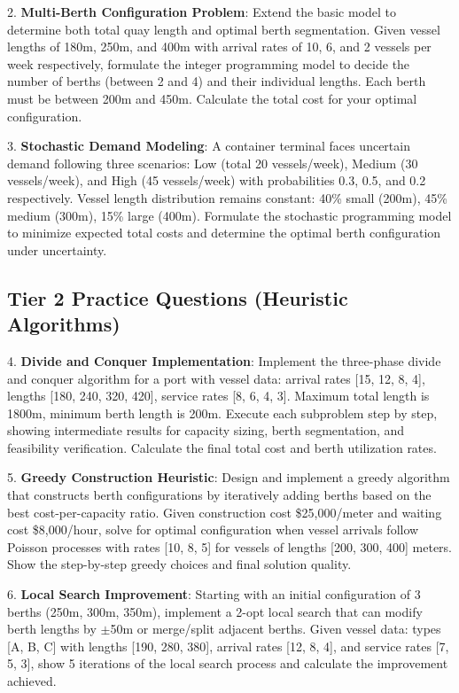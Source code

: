 \documentclass{article}
\begin{document}
2. \textbf{Multi-Berth Configuration Problem}: Extend the basic model to determine both total quay length and optimal berth segmentation. Given vessel lengths of 180m, 250m, and 400m with arrival rates of 10, 6, and 2 vessels per week respectively, formulate the integer programming model to decide the number of berths (between 2 and 4) and their individual lengths. Each berth must be between 200m and 450m. Calculate the total cost for your optimal configuration.

3. \textbf{Stochastic Demand Modeling}: A container terminal faces uncertain demand following three scenarios: Low (total 20 vessels/week), Medium (30 vessels/week), and High (45 vessels/week) with probabilities 0.3, 0.5, and 0.2 respectively. Vessel length distribution remains constant: 40\% small (200m), 45\% medium (300m), 15\% large (400m). Formulate the stochastic programming model to minimize expected total costs and determine the optimal berth configuration under uncertainty.

\subsection{Tier 2 Practice Questions (Heuristic Algorithms)}

4. \textbf{Divide and Conquer Implementation}: Implement the three-phase divide and conquer algorithm for a port with vessel data: arrival rates [15, 12, 8, 4], lengths [180, 240, 320, 420], service rates [8, 6, 4, 3]. Maximum total length is 1800m, minimum berth length is 200m. Execute each subproblem step by step, showing intermediate results for capacity sizing, berth segmentation, and feasibility verification. Calculate the final total cost and berth utilization rates.

5. \textbf{Greedy Construction Heuristic}: Design and implement a greedy algorithm that constructs berth configurations by iteratively adding berths based on the best cost-per-capacity ratio. Given construction cost \$25,000/meter and waiting cost \$8,000/hour, solve for optimal configuration when vessel arrivals follow Poisson processes with rates [10, 8, 5] for vessels of lengths [200, 300, 400] meters. Show the step-by-step greedy choices and final solution quality.

6. \textbf{Local Search Improvement}: Starting with an initial configuration of 3 berths (250m, 300m, 350m), implement a 2-opt local search that can modify berth lengths by $\pm$50m or merge/split adjacent berths. Given vessel data: types [A, B, C] with lengths [190, 280, 380], arrival rates [12, 8, 4], and service rates [7, 5, 3], show 5 iterations of the local search process and calculate the improvement achieved.
\end{document}
